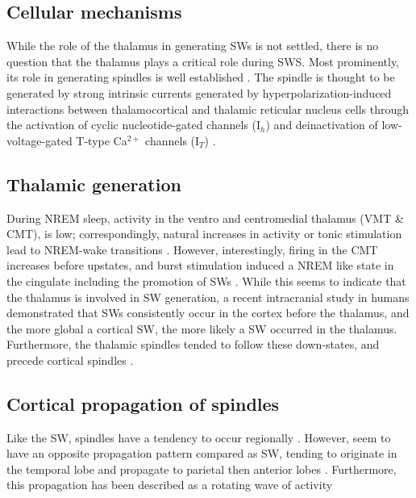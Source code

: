 \subsection*{Cellular mechanisms}
While the role of the thalamus in generating SWs is not settled, there is no question that the thalamus plays a critical role during SWS. Most prominently, its role in generating spindles is well established \citep{Crunelli2018}. The spindle is thought to be generated by strong intrinsic currents generated by hyperpolarization-induced interactions between thalamocortical and thalamic reticular nucleus cells through the activation of cyclic nucleotide-gated channels (I$_h$) and deinactivation of low-voltage-gated T-type Ca$^{2+}$ channels (I$_T$) \citep{Buzsaki2012, Crunelli2018, Mak-Mccully2017}.

\subsection*{Thalamic generation}
During NREM sleep, activity in the ventro and centromedial thalamus (VMT & CMT), is low; correspondingly, natural increases in activity or tonic stimulation lead to NREM-wake transitions \citep{Honjoh2018,Gent2018}. However, interestingly, firing in the CMT increases before upstates, and burst stimulation induced a NREM like state in the cingulate including the promotion of SWs \citep{Gent2018}. While this seems to indicate that the thalamus is involved in SW generation, a recent intracranial study in humans demonstrated that SWs consistently occur in the cortex before the thalamus, and the more global a cortical SW, the more likely a SW occurred in the thalamus. Furthermore, the thalamic spindles tended to follow these down-states, and precede cortical spindles \citep{Mak-Mccully2017}.

\subsection*{Cortical propagation of spindles}
Like the SW, spindles have a tendency to occur regionally \citep{Nir2011}. However, seem to have an opposite propagation pattern compared as SW, tending to originate in the temporal lobe and propagate to parietal then anterior lobes \citep{Nir2011}. Furthermore, this propagation has been described as a rotating wave of activity \citep{Muller2016} 

